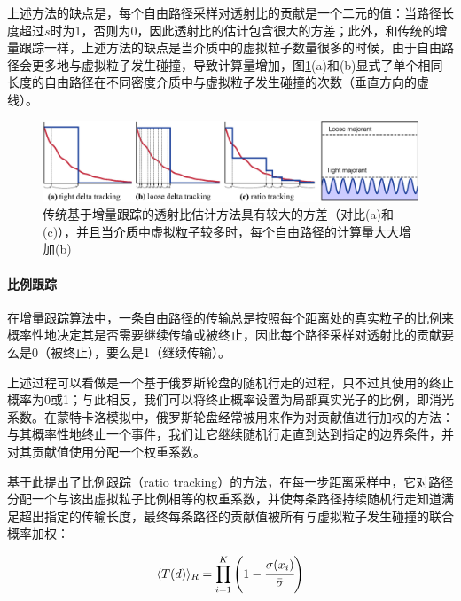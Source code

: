 上述方法的缺点是，每个自由路径采样对透射比的贡献是一个二元的值：当路径长度超过$s$时为1，否则为0，因此透射比的估计包含很大的方差；此外，和传统的增量跟踪一样，上述方法的缺点是当介质中的虚拟粒子数量很多的时候，由于自由路径会更多地与虚拟粒子发生碰撞，导致计算量增加，图\ref{f:pm-delta-vs-ratio}(a)和(b)显式了单个相同长度的自由路径在不同密度介质中与虚拟粒子发生碰撞的次数（垂直方向的虚线）。

\begin{figure}
\begin{fullwidth}
	\includegraphics[width=\thewidth]{figures/pm/delta-vs-ratio}
	\caption{传统基于增量跟踪的透射比估计方法具有较大的方差（对比(a)和(c)），并且当介质中虚拟粒子较多时，每个自由路径的计算量大大增加(b)}
	\label{f:pm-delta-vs-ratio}
\end{fullwidth}
\end{figure}




\paragraph{比例跟踪}
在增量跟踪算法中，一条自由路径的传输总是按照每个距离处的真实粒子的比例来概率性地决定其是否需要继续传输或被终止，因此每个路径采样对透射比的贡献要么是0（被终止），要么是1（继续传输）。

上述过程可以看做是一个基于俄罗斯轮盘的随机行走的过程，只不过其使用的终止概率为0或1；与此相反，我们可以将终止概率设置为局部真实光子的比例，即消光系数。在蒙特卡洛模拟中，俄罗斯轮盘经常被用来作为对贡献值进行加权的方法\cite{a:ComparativeanalysisofdiscreteandcontinuousabsorptionweightingestimatorsusedinMonteCarlosimulationsofradiativetransportinturbidmedia}：与其概率性地终止一个事件，我们让它继续随机行走直到达到指定的边界条件，并对其贡献值使用分配一个权重系数。

\cite{a:ResidualRatioTrackingforEstimatingAttenuationinParticipatingMedia}基于此提出了比例跟踪（ratio tracking）的方法，在每一步距离采样中，它对路径分配一个与该出虚拟粒子比例相等的权重系数，并使每条路径持续随机行走知道满足超出指定的传输长度，最终每条路径的贡献值被所有与虚拟粒子发生碰撞的联合概率加权：

\begin{equation}\label{e:pm-ratio}
	\langle T(d)\rangle_R=\prod^{K}_{i=1}\Bigg(1- \cfrac{\sigma(x_i)}{\bar{\sigma}}\Bigg)
\end{equation}

